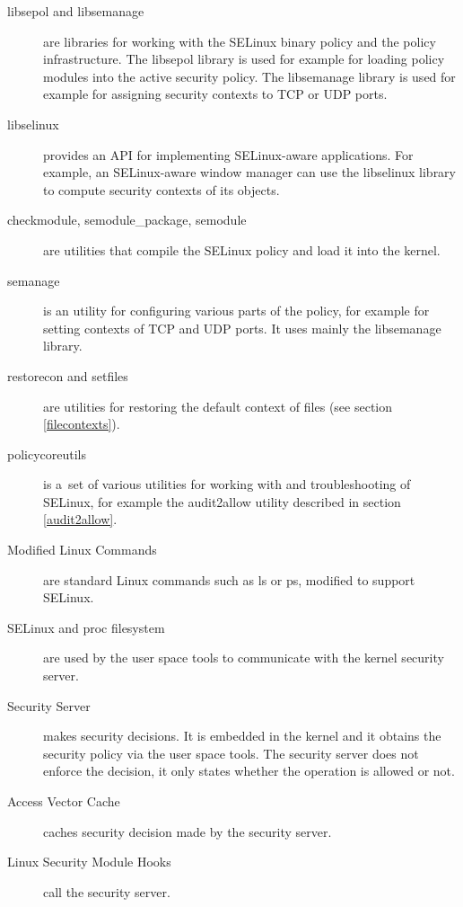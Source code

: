 \begin{description}
    \item [libsepol and libsemanage] are libraries for working with the SELinux
        binary policy and the policy infrastructure. The libsepol library is
        used for example for loading policy modules into the active security
        policy. The libsemanage library is used for example for assigning
        security contexts to TCP or UDP ports.
    \item [libselinux] provides an API for implementing SELinux-aware
        applications. For example, an SELinux-aware window manager can use the
        libselinux library to compute security contexts of its objects.
    \item [checkmodule, semodule\_package, semodule] are utilities that compile
        the SELinux policy and load it into the kernel.
    \item [semanage] is an utility for configuring various parts of the policy,
        for example for setting contexts of TCP and UDP ports. It uses mainly
        the libsemanage library.
    \item [restorecon and setfiles] are utilities for restoring the default
        context of files (see section \ref{filecontexts}).
    \item [policycoreutils] is a~set of various utilities for working with and
        troubleshooting of SELinux, for example the audit2allow utility
        described in section \ref{audit2allow}.
    \item [Modified Linux Commands] are standard Linux commands such as ls or
        ps, modified to support SELinux.
    \item [SELinux and proc filesystem] are used by the user space tools to
        communicate with the kernel security server.
    \item [Security Server] makes security decisions. It is embedded in the
        kernel and it obtains the security policy via the user space tools.
        The security server does not enforce the decision, it only states
        whether the operation is allowed or not.
    \item [Access Vector Cache] caches security decision made by the security
        server.
    \item [Linux Security Module Hooks] call the security server.
\end{description}


